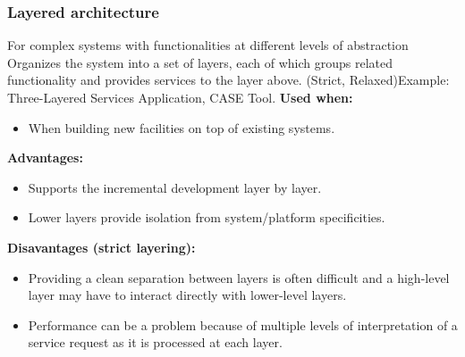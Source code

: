 \documentclass[../ESOF_notes.tex]{subfiles}
\begin{document}
\subsubsection{Layered architecture}  For complex systems with functionalities at different levels of abstraction\newline\newline
Organizes the system into a set of layers, each of which groups related functionality and provides services to the layer above. (Strict, Relaxed)\newline Example: Three-Layered Services Application, CASE Tool. \newline\newline
\textbf{Used when:}
\begin{itemize}
    \item When building new facilities on top of existing systems.
\end{itemize}
\textbf{Advantages:}
\begin{itemize}
    \item Supports the incremental development layer by layer.
    \item Lower layers provide isolation from system/platform specificities.
\end{itemize}
\textbf{Disavantages (strict layering):}
\begin{itemize}
    \item Providing a clean separation between layers is often difficult and a high-level layer may have to interact directly with lower-level layers.
    \item Performance can be a problem because of multiple levels of interpretation of a service request as it is processed at each layer.
\end{itemize}
\end{document}
